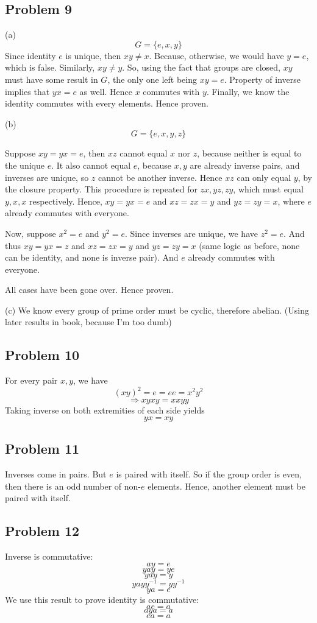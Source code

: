 \documentclass{book}
\begin{document}
\subsection*{Problem 9}
(a)
$$G = \{ e, x, y \}$$
Since identity $e$ is unique, then $xy \neq x$. Because, otherwise, we would have $y = e$, which is false. Similarly, $xy \neq y$. So, using the fact that groups are closed, $xy$ must have some result in $G$, the only one left being $xy = e$. Property of inverse implies that $yx = e$ as well. Hence $x$ commutes with $y$. Finally, we know the identity commutes with every elements. Hence proven.

\noindent
(b)
$$G = \{ e, x, y, z \}$$

Suppose $xy = yx = e$, then $xz$ cannot equal $x$ nor $z$, because neither is equal to the unique $e$. It also cannot equal $e$, because $x, y$ are already inverse pairs, and inverses are unique, so $z$ cannot be another inverse. Hence $xz$ can only equal $y$, by the closure property. This procedure is repeated for $zx, yz, zy$, which must equal $y, x, x$ respectively. Hence, $xy = yx = e$ and $xz = zx = y$ and $yz = zy = x$, where $e$ already commutes with everyone.

Now, suppose $x^2 = e$ and $y^2 = e$. Since inverses are unique, we have $z^2 = e$. And thus $xy = yx = z$ and $xz = zx = y$ and $yz = zy = x$ (same logic as before, none can be identity, and none is inverse pair). And $e$ already commutes with everyone.

All cases have been gone over. Hence proven.

\noindent
(c)
We know every group of prime order must be cyclic, therefore abelian. (Using later results in book, because I'm too dumb)

\subsection*{Problem 10}
For every pair $x, y$, we have
$$(xy)^2 = e = ee = x^2 y^2$$
$$\Rightarrow xyxy = xxyy$$
Taking inverse on both extremities of each side yields
$$yx = xy$$

\subsection*{Problem 11}
Inverses come in pairs. But $e$ is paired with itself. So if the group order is even, then there is an odd number of non-$e$ elements. Hence, another element must be paired with itself.

\subsection*{Problem 12}
Inverse is commutative:
$$ay = e$$
$$yay = ye$$
$$yay = y$$
$$yayy^{-1} = yy^{-1}$$
$$ya = e$$
We use this result to prove identity is commutative:
$$ae = a$$
$$aya = a$$
$$ea = a$$
\end{document}

